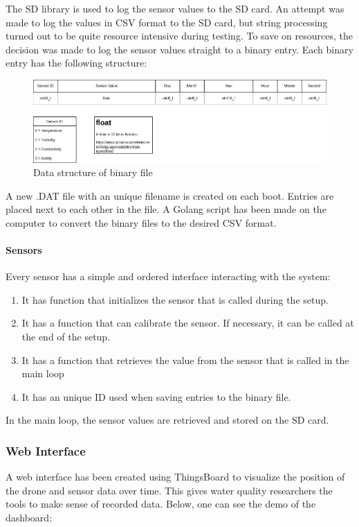 The SD library is used to log the sensor values to the \gls{SD} card. An attempt was made to log the values in \gls{CSV} format to the \gls{SD} card, but string processing turned out to be quite resource intensive during testing. To save on resources, the decision was made to log the sensor values straight to a binary entry. Each binary entry has the following structure:

\begin{figure}[h]
\centering
\includegraphics[scale=0.45]{070_design/software/61_datastructure.png}
\caption{Data structure of binary file}
\end{figure}

A new .DAT file with an unique filename is created on each boot. Entries are placed next to each other in the file. A Golang\cite{golang} script has been made on the computer to convert the binary files to the desired \gls{CSV} format. \cite{dat2csv}

\paragraph{Sensors}

Every sensor has a simple and ordered interface interacting with the system:
\begin{enumerate}
  \item It has function that initializes the sensor that is called during the setup.
  \item It has a function that can calibrate the sensor. If necessary, it can be called at the end of the setup.
  \item It has a function that retrieves the value from the sensor that is called in the main loop
  \item It has an unique ID used when saving entries to the binary file.
\end{enumerate}

In the main loop, the sensor values are retrieved and stored on the \gls{SD} card.
\newpage
\subsubsection{Web Interface}
A web interface has been created using ThingsBoard \cite{thingsboard} to visualize the position of the drone and sensor data over time. This gives water quality researchers the tools to make sense of recorded data. Below, one can see the demo of the dashboard:

